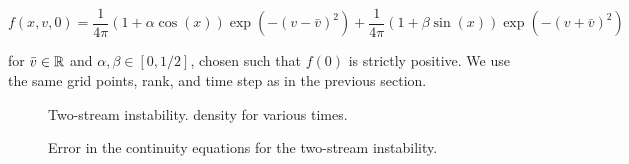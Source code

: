 \begin{equation}
    f(x, v, 0) = \frac{1}{4 \pi} (1 + \alpha \cos(x)) \exp (-(v - \bar{v})^2)
        + \frac{1}{4 \pi} (1 + \beta \sin(x)) \exp (-(v + \bar{v})^2)
\end{equation}

for $\bar{v} \in \mathbb{R}$ and $\alpha, \beta \in \left[ 0, 1/2 \right]$, chosen such 
that $f(0)$ is strictly positive. We use the same grid points, rank, and time step 
as in the previous section. 

\begin{figure}
    \centering
    \begin{subfigure}{0.45\textwidth}
    \end{subfigure}
    \begin{subfigure}{0.45\textwidth}
    \end{subfigure}
    \caption{
        Two-stream instability. density for various times. 
    }\label{fig:density_two_stream}
\end{figure}

\begin{figure}
    \centering
    \begin{subfigure}{0.45\textwidth}
    \end{subfigure}
    \begin{subfigure}{0.45\textwidth}
    \end{subfigure}
    \begin{subfigure}{0.45\textwidth}
    \end{subfigure}
    \begin{subfigure}{0.45\textwidth}
    \end{subfigure}
    \caption{
        Error in the continuity equations for the two-stream instability. 
    }\label{fig:moments_two_stream}
\end{figure}

